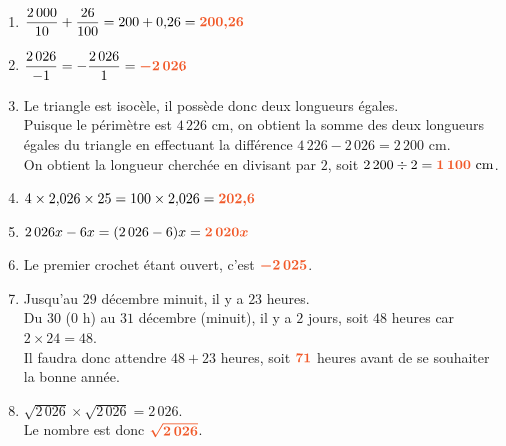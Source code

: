 \documentclass[a4paper,11pt]{article}
\begin{document}
\begin{seance}{}
\begin{enumerate}
        alors l'égalité est : $2\,026 \times 10^{{\color[HTML]{f15929}\boldsymbol{-3}}} =2{,}026$.
	\item $\dfrac{2\,000}{10}+\dfrac{26}{100}=200+0{,}26={\color[HTML]{f15929}\boldsymbol{200{,}26}}$\\
	\item $\dfrac{2\,026}{-1}=-\dfrac{2\,026}{1}={\color[HTML]{f15929}\boldsymbol{-2\,026}}$
	\item Le triangle est isocèle, il possède donc deux longueurs égales.\\
            Puisque le périmètre est  $4\,226\text{ cm}$, on obtient la somme des deux longueurs égales  du triangle en effectuant la différence $4\,226-2\,026=2\,200\text{ cm}$.\\
            On obtient la longueur cherchée en divisant par $2$, soit $2\,200\div 2={\color[HTML]{f15929}\boldsymbol{1\,100}}\text{ cm}$.
	\item $4 \times 2{,}026\times 25=100 \times 2{,}026={\color[HTML]{f15929}\boldsymbol{202{,}6}}$
	\item $2\,026x -6x= (2\,026 -6)x={\color[HTML]{f15929}\boldsymbol{2\,020x}}$ 
	\item Le premier crochet  étant ouvert, c'est ${\color[HTML]{f15929}\boldsymbol{-2\,025}}$.
	\item  Jusqu'au $29$ décembre minuit, il y a $23$ heures.  \\
        Du $30$ (0 h) au $31$ décembre (minuit), il y a $2$ jours, soit $48$ heures car $2\times 24 = 48$. \\
        Il faudra donc attendre $48+23$ heures, soit ${\color[HTML]{f15929}\boldsymbol{71}}$ heures avant de se souhaiter la bonne année.
       
	\item  $\sqrt{2\,026}\times \sqrt{2\,026}=2\,026$.\\
            Le nombre est donc ${\color[HTML]{f15929}\boldsymbol{\sqrt{2\,026}}}$.
            \end{enumerate}
            \end{seance}
            
\end{document}
